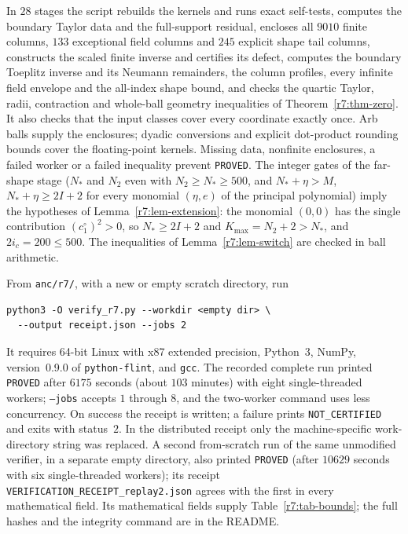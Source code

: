 \documentclass[11pt]{amsart}
\theoremstyle{definition}
\theoremstyle{remark}
\numberwithin{equation}{section}
\begin{document}
In $28$ stages the script rebuilds the kernels and runs exact self-tests, computes the boundary Taylor data and the full-support residual, encloses all $9010$ finite columns, $133$ exceptional field columns and $245$ explicit shape tail columns, constructs the scaled finite inverse and certifies its defect, computes the boundary Toeplitz inverse and its Neumann remainders, the column profiles, every infinite field envelope and the all-index shape bound, and checks the quartic Taylor, radii, contraction and whole-ball geometry inequalities of Theorem~\ref{r7:thm-zero}. It also checks that the input classes cover every coordinate exactly once. Arb balls supply the enclosures; dyadic conversions and explicit dot-product rounding bounds cover the floating-point kernels. Missing data, nonfinite enclosures, a failed worker or a failed inequality prevent \texttt{PROVED}. The integer gates of the far-shape stage ($N_*$ and $N_2$ even with $N_2\geq N_*\geq500$, and $N_*+\eta>M$, $N_*+\eta\geq2I+2$ for every monomial $(\eta,e)$ of the principal polynomial) imply the hypotheses of Lemma~\ref{r7:lem-extension}: the monomial $(0,0)$ has the single contribution $(c^\circ_1)^2>0$, so $N_*\geq2I+2$ and $K_{\max}=N_2+2>N_*$, and $2i_c=200\leq500$. The inequalities of Lemma~\ref{r7:lem-switch} are checked in ball arithmetic.

From \texttt{anc/r7/}, with a new or empty scratch directory, run
\begin{verbatim}
python3 -O verify_r7.py --workdir <empty dir> \
  --output receipt.json --jobs 2
\end{verbatim}
It requires 64-bit Linux with x87 extended precision, Python~3, NumPy, version~0.9.0 of \texttt{python-flint}, and \texttt{gcc}. The recorded complete run printed \texttt{PROVED} after $6175$ seconds (about $103$ minutes) with eight single-threaded workers; \texttt{--jobs} accepts $1$ through $8$, and the two-worker command uses less concurrency. On success the receipt is written; a failure prints \texttt{NOT\_CERTIFIED} and exits with status~$2$. In the distributed receipt only the machine-specific work-directory string was replaced. A second from-scratch run of the same unmodified verifier, in a separate empty directory, also printed \texttt{PROVED} (after $10629$ seconds with six single-threaded workers); its receipt \texttt{VERIFICATION\_RECEIPT\_replay2.json} agrees with the first in every mathematical field. Its mathematical fields supply Table~\ref{r7:tab-bounds}; the full hashes and the integrity command are in the README.
\end{document}
